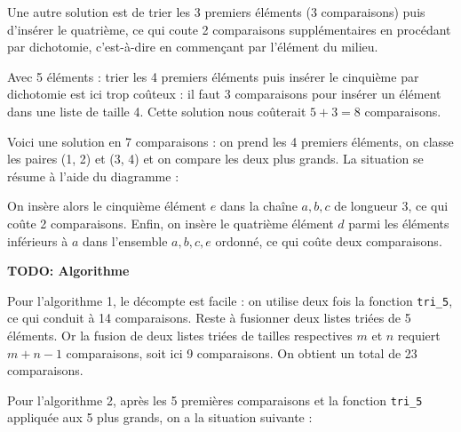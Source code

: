 Une autre solution est de trier les 3 premiers éléments (3 comparaisons) puis d'insérer le quatrième, ce qui coute 2 comparaisons supplémentaires en procédant par dichotomie, c'est-à-dire en commençant par l'élément du milieu.
\medskip

Avec 5 éléments : trier les 4 premiers éléments puis insérer le cinquième par dichotomie est ici trop coûteux : il faut 3 comparaisons pour insérer un élément dans une liste de taille 4. Cette solution nous coûterait $5+3=8$ comparaisons.
\medskip

Voici une solution en 7 comparaisons : on prend les 4 premiers éléments, on classe les paires (1, 2) et (3, 4) et on compare les deux plus grands. La situation se résume à l'aide du diagramme :

\begin{center}
\end{center}

On insère alors le cinquième élément $e$ dans la chaîne $a,b,c$ de longueur 3, ce qui coûte 2 comparaisons. Enfin, on insère le quatrième élément $d$ parmi les éléments inférieurs à $a$ dans l'ensemble $a,b,c,e$ ordonné, ce qui coûte deux comparaisons.

\textbf{TODO: Algorithme}

\Q
Pour l'algorithme 1, le décompte est facile : on utilise deux fois la fonction \texttt{tri\_5}, ce qui conduit à 14 comparaisons. Reste à fusionner deux listes triées de 5 éléments. Or la fusion de deux listes triées de tailles respectives $m$ et $n$ requiert $m+n-1$ comparaisons, soit ici 9 comparaisons. On obtient un total de 23 comparaisons.
\medskip

Pour l'algorithme 2, après les 5 premières comparaisons et la fonction \texttt{tri\_5} appliquée aux 5 plus grands, on a la situation suivante :
\bigskip

